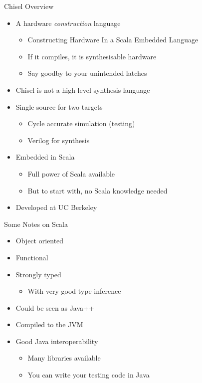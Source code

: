 \begin{frame}[fragile]{Chisel Overview}
\begin{itemize}
\item A hardware \emph{construction} language
\begin{itemize}
\item Constructing Hardware In a Scala Embedded Language
\item If it compiles, it is synthesisable hardware 
\item Say goodby to your unintended latches
\end{itemize}
\item Chisel is not a high-level synthesis language
\item Single source for two targets
\begin{itemize}
\item Cycle accurate simulation (testing)
\item Verilog for synthesis
\end{itemize}
\item Embedded in Scala
\begin{itemize}
\item Full power of Scala available
\item But to start with, no Scala knowledge needed
\end{itemize}
\item Developed at UC Berkeley
\end{itemize}
\end{frame}

\begin{frame}[fragile]{Some Notes on Scala}
\begin{itemize}
\item Object oriented
\item Functional
\item Strongly typed
\begin{itemize}
\item With very good type inference
\end{itemize}
\item Could be seen as Java++
\item Compiled to the JVM
\item Good Java interoperability
\begin{itemize}
\item Many libraries available
\item You can write your testing code in Java
\end{itemize}
\end{itemize}
\end{frame}


